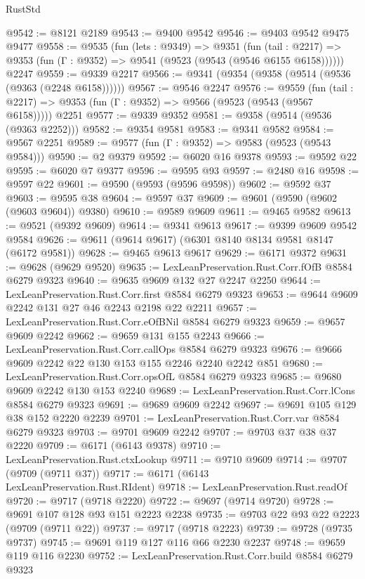 \begin{lexlean}{RustStd}
\begin{coremodule}
@9542 := @8121 @2189
@9543 := @9400 @9542
@9546 := @9403 @9542 @9475 @9477
@9558 := @9535
    (fun (lets : @9349) =>
    @9351
      (fun (tail : @2217) => @9353 (fun (Γ : @9352) => @9541 (@9523 (@9543 (@9546 @6155 @6158))))))
    @2247
@9559 := @9339 @2217
@9566 := @9341 (@9354 (@9358 (@9514 (@9536 (@9363 (@2248 @6158))))))
@9567 := @9546 @2247
@9576 := @9559
    (fun (tail : @2217) => @9353 (fun (Γ : @9352) => @9566 (@9523 (@9543 (@9567 @6158)))))
    @2251
@9577 := @9339 @9352
@9581 := @9358 (@9514 (@9536 (@9363 @2252)))
@9582 := @9354 @9581
@9583 := @9341 @9582
@9584 := @9567 @2251
@9589 := @9577 (fun (Γ : @9352) => @9583 (@9523 (@9543 @9584)))
@9590 := @2 @9379
@9592 := @6020 @16 @9378
@9593 := @9592 @22
@9595 := @6020 @7 @9377
@9596 := @9595 @93
@9597 := @2480 @16
@9598 := @9597 @22
@9601 := @9590 (@9593 (@9596 @9598))
@9602 := @9592 @37
@9603 := @9595 @38
@9604 := @9597 @37
@9609 := @9601 (@9590 (@9602 (@9603 @9604)) @9380)
@9610 := @9589 @9609
@9611 := @9465 @9582
@9613 := @9521 (@9392 @9609)
@9614 := @9341 @9613
@9617 := @9399 @9609 @9542 @9584
@9626 := @9611 (@9614 @9617) (@6301 @8140 @8134 @9581 @8147 (@6172 @9581))
@9628 := @9465 @9613 @9617
@9629 := @6171 @9372
@9631 := @9628 (@9629 @9520)
@9635 := LexLeanPreservation.Rust.Corr.fOfB @8584 @6279 @9323
@9640 := @9635 @9609 @132 @27 @2247 @2250
@9644 := LexLeanPreservation.Rust.Corr.first @8584 @6279 @9323
@9653 := @9644 @9609 @2242 @131 @27 @46 @2243 @2198 @22 @2211
@9657 := LexLeanPreservation.Rust.Corr.eOfBNil @8584 @6279 @9323
@9659 := @9657 @9609 @2242
@9662 := @9659 @131 @155 @2243
@9666 := LexLeanPreservation.Rust.Corr.callOps @8584 @6279 @9323
@9676 := @9666 @9609 @2242 @22 @130 @153 @155 @2246 @2240 @2242 @851
@9680 := LexLeanPreservation.Rust.Corr.opsOfL @8584 @6279 @9323
@9685 := @9680 @9609 @2242 @130 @153 @2240
@9689 := LexLeanPreservation.Rust.Corr.lCons @8584 @6279 @9323
@9691 := @9689 @9609 @2242
@9697 := @9691 @105 @129 @38 @152 @2220 @2239
@9701 := LexLeanPreservation.Rust.Corr.var @8584 @6279 @9323
@9703 := @9701 @9609 @2242
@9707 := @9703 @37 @38 @37 @2220
@9709 := @6171 (@6143 @9378)
@9710 := LexLeanPreservation.Rust.ctxLookup
@9711 := @9710 @9609
@9714 := @9707 (@9709 (@9711 @37))
@9717 := @6171 (@6143 LexLeanPreservation.Rust.RIdent)
@9718 := LexLeanPreservation.Rust.readOf
@9720 := @9717 (@9718 @2220)
@9722 := @9697 (@9714 @9720)
@9728 := @9691 @107 @128 @93 @151 @2223 @2238
@9735 := @9703 @22 @93 @22 @2223 (@9709 (@9711 @22))
@9737 := @9717 (@9718 @2223)
@9739 := @9728 (@9735 @9737)
@9745 := @9691 @119 @127 @116 @66 @2230 @2237
@9748 := @9659 @119 @116 @2230
@9752 := LexLeanPreservation.Rust.Corr.build @8584 @6279 @9323

\end{coremodule}
\end{lexlean}
